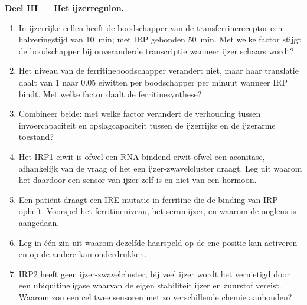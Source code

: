 \begin{problem}
\medskip
\noindent\textbf{Deel III --- Het ijzerregulon.}
\begin{enumerate}[resume]
  \item In ijzerrijke cellen heeft de boodschapper van de
        transferrinereceptor een halveringstijd van \qty{10}{min}; met
        IRP gebonden \qty{50}{min}. Met welke factor stijgt de
        boodschapper bij onveranderde transcriptie wanneer ijzer
        schaars wordt?
  \item Het niveau van de ferritineboodschapper verandert niet, maar
        haar translatie daalt van $1$ naar $0.05$ eiwitten per
        boodschapper per minuut wanneer IRP bindt. Met welke factor
        daalt de ferritinesynthese?
  \item Combineer beide: met welke factor verandert de verhouding
        tussen invoercapaciteit en opslagcapaciteit tussen de
        ijzerrijke en de ijzerarme toestand?
  \item Het IRP1-eiwit is ofwel een RNA-bindend eiwit ofwel een
        aconitase, afhankelijk van de vraag of het een
        ijzer-zwavelcluster draagt. Leg uit waarom het daardoor een
        sensor van ijzer zelf is en niet van een hormoon.
  \item Een patiënt draagt een IRE-mutatie in ferritine die de binding
        van IRP opheft. Voorspel het ferritineniveau, het serumijzer,
        en waarom de ooglens is aangedaan.
  \item Leg in één zin uit waarom dezelfde haarspeld op de ene positie
        kan activeren en op de andere kan onderdrukken.
  \item IRP2 heeft geen ijzer-zwavelcluster; bij veel ijzer wordt het
        vernietigd door een ubiquitineligase waarvan de eigen
        stabiliteit ijzer en zuurstof vereist. Waarom zou een cel twee
        sensoren met zo verschillende chemie aanhouden?
\end{enumerate}


\end{problem}

